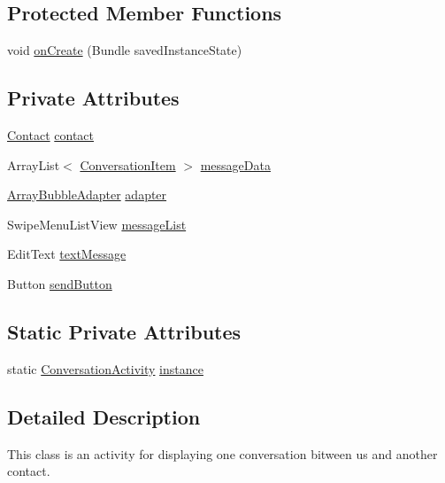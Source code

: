 \subsection*{Protected Member Functions}
\begin{DoxyCompactItemize}
\item 
void \hyperlink{a00006_a85e87cb5ced88dff7c8173ecc4f636d1}{on\+Create} (Bundle saved\+Instance\+State)
\end{DoxyCompactItemize}
\subsection*{Private Attributes}
\begin{DoxyCompactItemize}
\item 
\hyperlink{a00005}{Contact} \hyperlink{a00006_a3459849ab29ad684658dbcd0cf8c5d5a}{contact}
\item 
Array\+List$<$ \hyperlink{a00007}{Conversation\+Item} $>$ \hyperlink{a00006_a68544a0bda28776dfb51718a3c71bf69}{message\+Data}
\item 
\hyperlink{a00002}{Array\+Bubble\+Adapter} \hyperlink{a00006_adaad4a865e59995c45ef2ad13f6e88a9}{adapter}
\item 
Swipe\+Menu\+List\+View \hyperlink{a00006_ae5bb074a89738fa417e643960b0041c6}{message\+List}
\item 
Edit\+Text \hyperlink{a00006_abc418be8d11246756bfcb7f95123a88d}{text\+Message}
\item 
Button \hyperlink{a00006_a2e4d147a434708e05027f41ecf9ed577}{send\+Button}
\end{DoxyCompactItemize}
\subsection*{Static Private Attributes}
\begin{DoxyCompactItemize}
\item 
static \hyperlink{a00006}{Conversation\+Activity} \hyperlink{a00006_a64a39fb2b7f756356462736dfbdb9f9f}{instance}
\end{DoxyCompactItemize}


\subsection{Detailed Description}
This class is an activity for displaying one conversation bitween us and another contact. 


